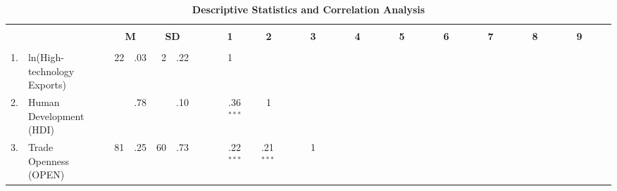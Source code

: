 


\begin{sidewaystable}[!htbp]
\setlength\tabcolsep{2pt}
\footnotesize
\centering


\caption{\textbf{ Descriptive Statistics and Correlation Analysis } } \label{table:correlation}
\vspace{.5cm}
\begin{tabularx}{0.9\textwidth}{r@{ \ \ }p{5cm}r@{}lr@{}lr@{}lr@{}lr@{}lr@{}lr@{}lr@{}lr@{}lr@{}lr@{}lr@{}lr@{}lp{1cm}}  %
\hline \\[-0.22cm]
\multicolumn{2}{c}{\textbf{ }}  & \multicolumn{2}{p{0.5cm}}{ } & \multicolumn{2}{c}{\textbf{M}} & \multicolumn{2}{c}{\textbf{SD}} & \multicolumn{2}{p{1.5cm}}{ }  & \multicolumn{2}{c}{\textbf{1}}  & \multicolumn{2}{c}{\textbf{2}}  & \multicolumn{2}{c}{\textbf{3}}  & \multicolumn{2}{c}{\textbf{4}}  & \multicolumn{2}{c}{\textbf{5}}  & \multicolumn{2}{c}{\textbf{6}}  & \multicolumn{2}{c}{\textbf{7}}  & \multicolumn{2}{c}{\textbf{8}}  & \multicolumn{2}{c}{\textbf{9}}  \\
\hline
 & \\
1. & ln(High-technology Exports) & \multicolumn{2}{p{0.5cm}}{ }  & 22&.03 & 2&.22 & \multicolumn{2}{p{0.5cm}}{ }   & \multicolumn{2}{c}{1}   & \multicolumn{2}{c}{ \  \  \  \  \  \  \ }   & \multicolumn{2}{c}{ \  \  \  \  \  \  \ }   & \multicolumn{2}{c}{ \  \  \  \  \  \  \ }   & \multicolumn{2}{c}{ \  \  \  \  \  \  \ }   & \multicolumn{2}{c}{ \  \  \  \  \  \  \ }   & \multicolumn{2}{c}{ \  \  \  \  \  \  \ }   & \multicolumn{2}{c}{ \  \  \  \  \  \  \ }   & \multicolumn{2}{c}{ \  \  \  \  \  \  \ }  \\[0.33cm]
2. & Human Development (HDI) & \multicolumn{2}{p{0.5cm}}{ }  & &.78 & &.10 & \multicolumn{2}{p{0.5cm}}{ }  & &.36{$^{***}$}  & \multicolumn{2}{c}{1}   & \multicolumn{2}{c}{ \  \  \  \  \  \  \ }   & \multicolumn{2}{c}{ \  \  \  \  \  \  \ }   & \multicolumn{2}{c}{ \  \  \  \  \  \  \ }   & \multicolumn{2}{c}{ \  \  \  \  \  \  \ }   & \multicolumn{2}{c}{ \  \  \  \  \  \  \ }   & \multicolumn{2}{c}{ \  \  \  \  \  \  \ }   & \multicolumn{2}{c}{ \  \  \  \  \  \  \ }  \\[0.33cm]
3. & Trade Openness (OPEN) & \multicolumn{2}{p{0.5cm}}{ }  & 81&.25 & 60&.73 & \multicolumn{2}{p{0.5cm}}{ }  & &.22{$^{***}$} & &.21{$^{***}$}  & \multicolumn{2}{c}{1}   & \multicolumn{2}{c}{ \  \  \  \  \  \  \ }   & \multicolumn{2}{c}{ \  \  \  \  \  \  \ }   & \multicolumn{2}{c}{ \  \  \  \  \  \  \ }   & \multicolumn{2}{c}{ \  \  \  \  \  \  \ }   & \multicolumn{2}{c}{ \  \  \  \  \  \  \ }   & \multicolumn{2}{c}{ \  \  \  \  \  \  \ }  \\[0.33cm]

\end{tabularx}
\end{sidewaystable}
